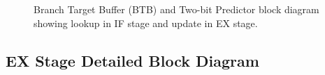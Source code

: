 \begin{landscape}
\begin{figure}[ht]
    \caption{Branch Target Buffer (BTB) and Two-bit Predictor block diagram showing lookup in IF stage and update in EX stage.}
    \label{fig:btb_diagram}
\end{figure}
\end{landscape}

\subsection{EX Stage Detailed Block Diagram}

